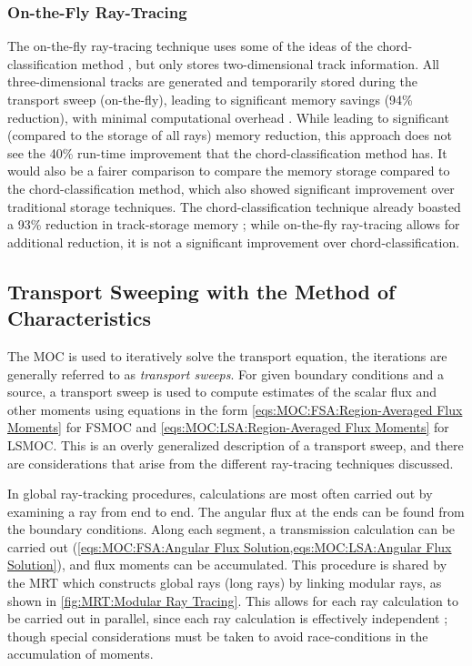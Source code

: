 {{{        \subsubsection{On-the-Fly Ray-Tracing}{\label{ssec:RT:On-the-Fly Ray-Tracing}
          The on-the-fly ray-tracing technique \cite{Gunow2016} uses some of the ideas of the chord-classification method \cite{Sciannandrone2016}, but only stores two-dimensional track information.
          All three-dimensional tracks are generated and temporarily stored during the transport sweep (on-the-fly), leading to significant memory savings (94\% reduction), with minimal computational overhead \cite{Gunow2016}.
          While leading to significant (compared to the storage of all rays) memory reduction, this approach does not see the 40\% run-time improvement that the chord-classification method has.
          It would also be a fairer comparison to compare the memory storage compared to the chord-classification method, which also showed significant improvement over traditional storage techniques.
          The chord-classification technique already boasted a 93\% reduction in track-storage memory \cite{Sciannandrone2016}; while on-the-fly ray-tracing allows for additional reduction, it is not a significant improvement over chord-classification.
        }
      }

      \subsection{Transport Sweeping with the Method of Characteristics}{\label{ssec:RT:Transport Sweeping with the Method of Characteristics}
        The \ac{MOC} is used to iteratively solve the transport equation, the iterations are generally referred to as \emph{transport sweeps}.
        For given boundary conditions and a source, a transport sweep is used to compute estimates of the scalar flux and other moments using equations in the form \cref{eqs:MOC:FSA:Region-Averaged Flux Moments} for \ac{FSMOC} and \cref{eqs:MOC:LSA:Region-Averaged Flux Moments} for \ac{LSMOC}.
        This is an overly generalized description of a transport sweep, and there are considerations that arise from the different ray-tracing techniques discussed.

        In global ray-tracking procedures, calculations are most often carried out by examining a ray from end to end.
        The angular flux at the ends can be found from the boundary conditions.
        Along each segment, a transmission calculation can be carried out (\cref{eqs:MOC:FSA:Angular Flux Solution,eqs:MOC:LSA:Angular Flux Solution}), and flux moments can be accumulated.
        This procedure is shared by the \ac{MRT} which constructs global rays (long rays) by linking modular rays, as shown in \cref{fig:MRT:Modular Ray Tracing}.
        This allows for each ray calculation to be carried out in parallel, since each ray calculation is effectively independent \cite{Kochunas2013}; though special considerations must be taken to avoid race-conditions in the accumulation of moments.

}}}
